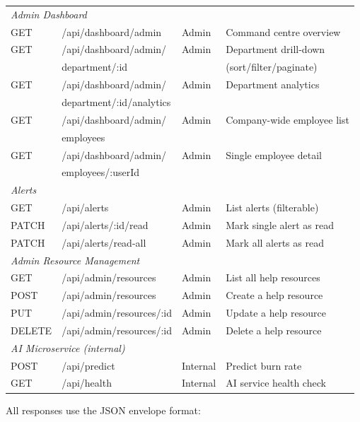 \documentclass[12pt,a4paper]{article}
\begin{document}
\begin{longtable}{@{}llll@{}}
  \multicolumn{4}{l}{\textit{Admin Dashboard}} \\
  GET    & /api/dashboard/admin   & Admin    & Command centre overview \\
  GET    & /api/dashboard/admin/  & Admin    & Department drill-down \\
         & \quad department/:id   &          & (sort/filter/paginate) \\
  GET    & /api/dashboard/admin/  & Admin    & Department analytics \\
         & \quad department/:id/analytics &  & \\
  GET    & /api/dashboard/admin/  & Admin    & Company-wide employee list \\
         & \quad employees        &          & \\
  GET    & /api/dashboard/admin/  & Admin    & Single employee detail \\
         & \quad employees/:userId &         & \\
  \midrule

  \multicolumn{4}{l}{\textit{Alerts}} \\
  GET    & /api/alerts            & Admin    & List alerts (filterable) \\
  PATCH  & /api/alerts/:id/read   & Admin    & Mark single alert as read \\
  PATCH  & /api/alerts/read-all   & Admin    & Mark all alerts as read \\
  \midrule

  \multicolumn{4}{l}{\textit{Admin Resource Management}} \\
  GET    & /api/admin/resources   & Admin    & List all help resources \\
  POST   & /api/admin/resources   & Admin    & Create a help resource \\
  PUT    & /api/admin/resources/:id & Admin  & Update a help resource \\
  DELETE & /api/admin/resources/:id & Admin  & Delete a help resource \\
  \midrule

  \multicolumn{4}{l}{\textit{AI Microservice (internal)}} \\
  POST   & /api/predict           & Internal & Predict burn rate \\
  GET    & /api/health            & Internal & AI service health check \\
\end{longtable}

All responses use the JSON envelope format:
\end{document}
